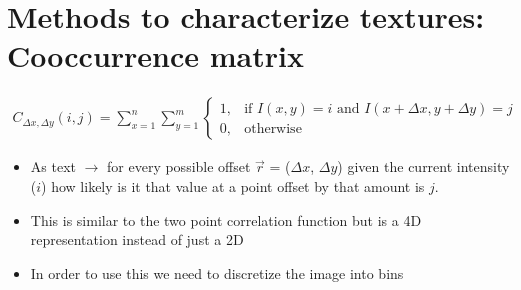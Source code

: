 \documentclass[letterpaper,10pt,english]{sphinxmanual}
\begin{document}
\begin{sphinxVerbatim}[commandchars=\\\{\}]
      

     
       
                  
\end{sphinxVerbatim}

\noindent{}


\section{Methods to characterize textures: Co\sphinxhyphen{}occurrence matrix}
\label{\detokenize{06-AdvancedShapeAndTexture:methods-to-characterize-textures-co-occurrence-matrix}}\begin{equation*}
\begin{split}
C_{\Delta x, \Delta y}(i,j)=\sum_{x=1}^n\sum_{y=1}^m\begin{cases} 1, & \text{if }I(x, y)=i\text{ and }I(x+\Delta x, y+\Delta y)=j \\ 0, & \text{otherwise}\end{cases}
\end{split}
\end{equation*}\begin{itemize}
\item {} 
\sphinxAtStartPar
As text \(\rightarrow\) for every possible offset \(\vec{r}\) = (\(\Delta x\), \(\Delta y\)) given the current intensity (\(i\)) how likely is it that value at a point offset by that amount is \(j\).

\item {} 
\sphinxAtStartPar
This is similar to the two point correlation function but is a 4D representation instead of just a 2D

\item {} 
\sphinxAtStartPar
In order to use this we need to discretize the image into bins

\end{itemize}
\end{document}
